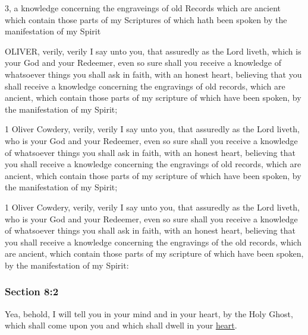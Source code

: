 		\begin{framed}
		\scriptsize
			\begin{compactdesc}
				\item[JSP] 3, a knowledge concerning the engraveings of old Records which are ancient which contain those parts of my Scriptures of which hath been spoken by the manifestation of my Spirit
				\item[BC] OLIVER, verily, verily I say unto you, that assuredly as the Lord liveth, which is your God and your Redeemer, even so sure shall you receive a knowledge of whatsoever things you shall ask in faith, with an honest heart, believing that you shall receive a knowledge concerning the engravings of old records, which are ancient, which contain those parts of my scripture of which have been spoken, by the manifestation of my Spirit;
				\item[DC 1835] 1 Oliver Cowdery, verily, verily I say unto you, that assuredly as the Lord liveth, who is your God and your Redeemer, even so sure shall you receive a knowledge of whatsoever things you shall ask in faith, with an honest heart, believing that you shall receive a knowledge concerning the engravings of old records, which are ancient, which contain those parts of my scripture of which have been spoken, by the manifestation of my Spirit;
				\item[DC 1844] 1 Oliver Cowdery, verily, verily I say unto you, that assuredly as the Lord liveth, who is your God and your Redeemer, even so sure shall you receive a knowledge of whatsoever things you shall ask in faith, with an honest heart, believing that you shall receive a knowledge concerning the engravings of the old records, which are ancient, which contain those parts of my scripture of which have been spoken, by the manifestation of my Spirit: 
			\end{compactdesc}
		\end{framed}

	\subsubsection{Section 8:2} %
		\label{DC8-2}

		Yea, behold, I will tell you in your mind and in your heart, by the Holy Ghost, which shall come upon you and which shall dwell in your \hyperref[HEART]{heart}.

